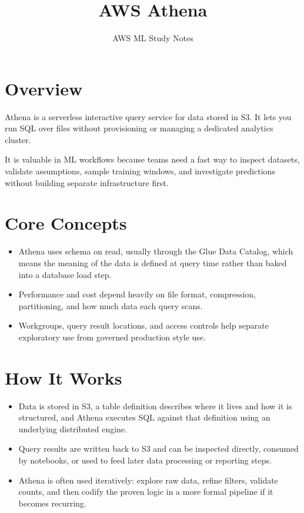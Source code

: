 \documentclass[10pt,twocolumn]{article}
\begin{document}
\title{\vspace{-1.6cm}AWS Athena}
\author{AWS ML Study Notes}
\date{}
\maketitle
\small

\section*{Overview}
Athena is a serverless interactive query service for data stored in S3. It lets you run SQL over files without provisioning or managing a dedicated analytics cluster.

It is valuable in ML workflows because teams need a fast way to inspect datasets, validate assumptions, sample training windows, and investigate predictions without building separate infrastructure first.

\section*{Core Concepts}
\begin{itemize}
\item Athena uses schema on read, usually through the Glue Data Catalog, which means the meaning of the data is defined at query time rather than baked into a database load step.
\item Performance and cost depend heavily on file format, compression, partitioning, and how much data each query scans.
\item Workgroups, query result locations, and access controls help separate exploratory use from governed production style use.
\end{itemize}

\section*{How It Works}
\begin{itemize}
\item Data is stored in S3, a table definition describes where it lives and how it is structured, and Athena executes SQL against that definition using an underlying distributed engine.
\item Query results are written back to S3 and can be inspected directly, consumed by notebooks, or used to feed later data processing or reporting steps.
\item Athena is often used iteratively: explore raw data, refine filters, validate counts, and then codify the proven logic in a more formal pipeline if it becomes recurring.
\end{itemize}
\end{document}

